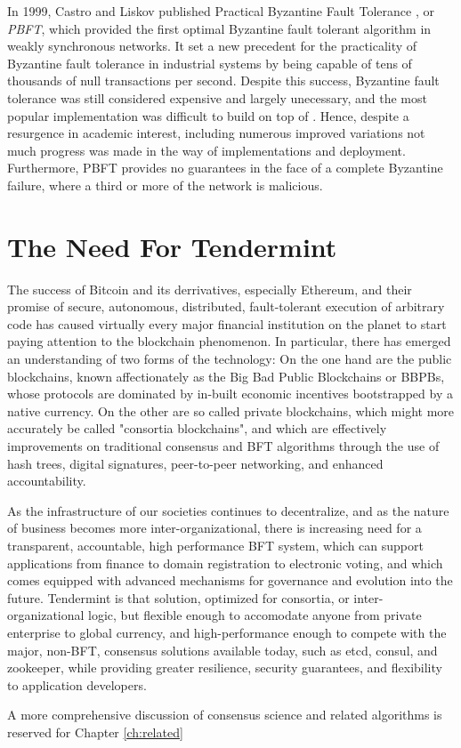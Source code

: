 In 1999, Castro and Liskov published Practical Byzantine Fault Tolerance \cite{pbft}, or \emph{PBFT}, 
which provided the first optimal Byzantine fault tolerant algorithm in weakly synchronous networks.
It set a new precedent for the practicality of Byzantine fault tolerance in industrial systems by being capable of 
tens of thousands of null transactions per second.
Despite this success, Byzantine fault tolerance was still considered expensive and largely unecessary, 
and the most popular implementation was difficult to build on top of \cite{ppbft}.
Hence, despite a resurgence in academic interest, including numerous improved variations \cite{yin2003separating, kotla2007zyzzyva}
not much progress was made in the way of implementations and deployment.
Furthermore, PBFT provides no guarantees in the face of a complete Byzantine failure, where a third or more of the network is malicious.

\section{The Need For Tendermint}

The success of Bitcoin and its derrivatives, especially Ethereum, and their promise of secure, autonomous, distributed, fault-tolerant execution of arbitrary code has caused virtually every major financial institution on the planet to start paying attention to the blockchain phenomenon. 
In particular, there has emerged an understanding of two forms of the technology:
On the one hand are the public blockchains, known affectionately as the Big Bad Public Blockchains or BBPBs, 
whose protocols are dominated by in-built economic incentives bootstrapped by a native currency.
On the other are so called private blockchains, which might more accurately be called "consortia blockchains",
and which are effectively improvements on traditional consensus and BFT algorithms through the use of hash trees, digital signatures, 
peer-to-peer networking, and enhanced accountability.

As the infrastructure of our societies continues to decentralize, and as the nature of business becomes more inter-organizational,
there is increasing need for a transparent, accountable, high performance BFT system, which can support applications from finance to domain registration to electronic voting,
and which comes equipped with advanced mechanisms for governance and evolution into the future.
Tendermint is that solution, optimized for consortia, or inter-organizational logic, but flexible enough to accomodate anyone from private enterprise to global currency,
and high-performance enough to compete with the major, non-BFT, consensus solutions available today, such as etcd, consul, and zookeeper, while providing greater resilience, security guarantees, and flexibility to application developers.

A more comprehensive discussion of consensus science and related algorithms is reserved for Chapter \ref{ch:related}

